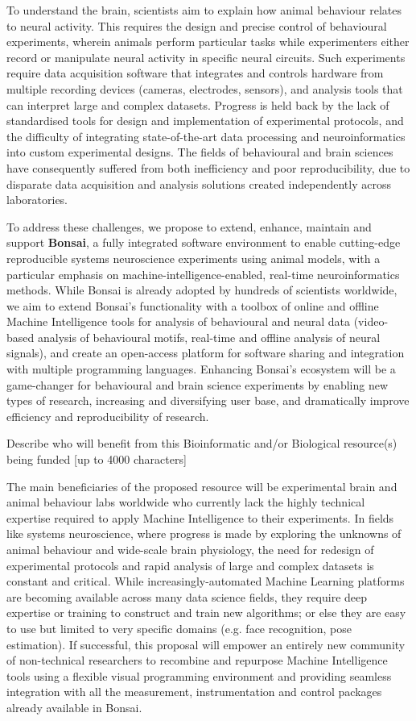 To understand the brain, scientists aim to explain how animal behaviour relates to neural activity. This requires the design and precise control of behavioural experiments, wherein animals perform particular tasks while experimenters either record or manipulate neural activity in specific neural circuits. Such experiments require data acquisition software that integrates and controls hardware from multiple recording devices (cameras, electrodes, sensors), and analysis tools that can interpret large and complex datasets. Progress is held back by the lack of standardised tools for design and implementation of experimental protocols, and the difficulty of integrating state-of-the-art data processing and neuroinformatics into custom experimental designs. The fields of behavioural and brain sciences have consequently suffered from both inefficiency and poor reproducibility, due to disparate data acquisition and analysis solutions created independently across laboratories.   

To address these challenges, we propose to extend, enhance, maintain and support \textbf{Bonsai}, a fully integrated software environment to enable cutting-edge reproducible systems neuroscience experiments using animal models, with a particular emphasis on machine-intelligence-enabled, real-time neuroinformatics methods. While Bonsai is already adopted by hundreds of scientists worldwide, we aim to extend Bonsai’s functionality with a toolbox of online and offline Machine Intelligence tools for analysis of behavioural and neural data (video-based analysis of behavioural motifs, real-time and offline analysis of neural signals), and create an open-access platform for software sharing and integration with multiple programming languages. Enhancing Bonsai's ecosystem will be a game-changer for behavioural and brain science experiments by enabling new types of research, increasing and diversifying user base, and dramatically improve efficiency and reproducibility of research.


Describe who will benefit from this Bioinformatic and/or Biological resource(s) being funded [up to 4000 characters]

The main beneficiaries of the proposed resource will be experimental brain and animal behaviour labs worldwide who currently lack the highly technical expertise required to apply Machine Intelligence to their experiments. In fields like systems neuroscience, where progress is made by exploring the unknowns of animal behaviour and wide-scale brain physiology, the need for redesign of experimental protocols and rapid analysis of large and complex datasets is constant and critical. While increasingly-automated Machine Learning platforms are becoming available across many data science fields, they require deep expertise or training to construct and train new algorithms; or else they are easy to use but limited to very specific domains (e.g. face recognition, pose estimation). If successful, this proposal will empower an entirely new community of non-technical researchers to recombine and repurpose Machine Intelligence tools using a flexible visual programming environment and providing seamless integration with all the measurement, instrumentation and control packages already available in Bonsai.

